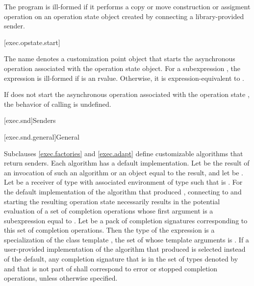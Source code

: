 \pnum
The program is ill-formed
if it performs a copy or move construction or assigment operation on
an operation state object created by connecting a library-provided sender.

[exec.opstate.start]{}

\pnum
The name  denotes a customization point object
that starts
the asynchronous operation associated with the operation state object.
For a subexpression ,
the expression  is ill-formed
if  is an rvalue.
Otherwise, it is expression-equivalent to
.

\pnum
If  does not start
the asynchronous operation associated with the operation state ,
the behavior of calling  is undefined.

[exec.snd]{Senders}

[exec.snd.general]{General}

\pnum
Subclauses \ref{exec.factories} and \ref{exec.adapt} define
customizable algorithms that return senders.
Each algorithm has a default implementation.
Let  be the result of an invocation of such an algorithm or
an object equal to the result, and
let  be .
Let  be a receiver of type 
with associated environment  of type 
such that  is .
For the default implementation of the algorithm that produced ,
connecting  to  and
starting the resulting operation state
necessarily results in the potential evaluation of
a set of completion operations
whose first argument is a subexpression equal to .
Let  be a pack of completion signatures corresponding to
this set of completion operations.
Then the type of the expression  is
a specialization of
the class template ,
the set of whose template arguments is .
If a user-provided implementation of the algorithm
that produced  is selected instead of the default,
any completion signature
that is in the set of types
denoted by  and
that is not part of  shall correspond to
error or stopped completion operations,
unless otherwise specified.

